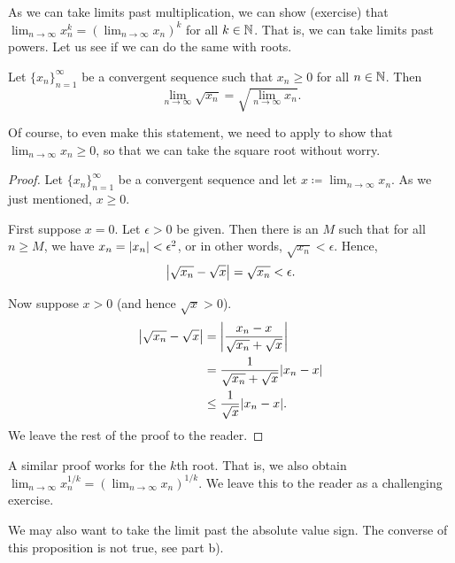 As we can take limits past multiplication, we can show (exercise)
that $\lim_{n\to\infty} x_n^k = {(\lim_{n\to\infty} x_n)}^k$ for all $k \in {\mathbb{N}}$.
That is, we can take limits
past powers.  Let us see if we can do the same with roots.

\begin{prop}
\pagebreak[2]
Let $\{ x_n \}_{n=1}^\infty$ be a convergent sequence such
that $x_n \geq 0$ for all $n \in {\mathbb{N}}$.
Then
\begin{equation*}
\lim_{n\to\infty} \sqrt{x_n} =
\sqrt{ \lim_{n\to\infty} x_n } .
\end{equation*}
\end{prop}

Of course, to even make this statement, we need to apply
 to show
that
$\lim_{n\to\infty} x_n \geq 0$, so that we can take the square root without
worry.

\begin{proof}
Let $\{ x_n \}_{n=1}^\infty$ be a convergent sequence and let $x \coloneqq
\lim_{n\to\infty} x_n$.
As we just mentioned, $x \geq 0$.

First suppose $x=0$.  Let $\epsilon > 0$ be given.
Then there is an $M$ such that for all $n \geq M$, we have
$x_n = \lvert {x_n} \rvert < \epsilon^2$, or in other words, $\sqrt{x_n} < \epsilon$.
Hence,
\begin{equation*}
\left\lvert {\sqrt{x_n} - \sqrt{x}} \right\rvert =
\sqrt{x_n} < \epsilon.
\end{equation*}

Now suppose $x > 0$ (and hence $\sqrt{x} > 0$).
\begin{equation*}
\begin{split}
\left\lvert {\sqrt{x_n}-\sqrt{x}} \right\rvert &= 
\left\lvert {\frac{x_n-x}{\sqrt{x_n}+\sqrt{x}}} \right\rvert \\
&=
\frac{1}{\sqrt{x_n}+\sqrt{x}}
\lvert {x_n-x} \rvert \\
& \leq
\frac{1}{\sqrt{x}}
\lvert {x_n-x} \rvert .
\end{split}
\end{equation*}
We leave the rest of the proof to the reader.
\end{proof}

A similar proof works for the $k$th root.  That is, we also
obtain
$\lim_{n\to\infty} x_n^{1/k} = {( \lim_{n\to\infty} x_n )}^{1/k}$.  We leave this to the reader
as a challenging exercise.

We may also want to take the limit past the absolute value sign.
The converse of this proposition is not true, see
 part b).


